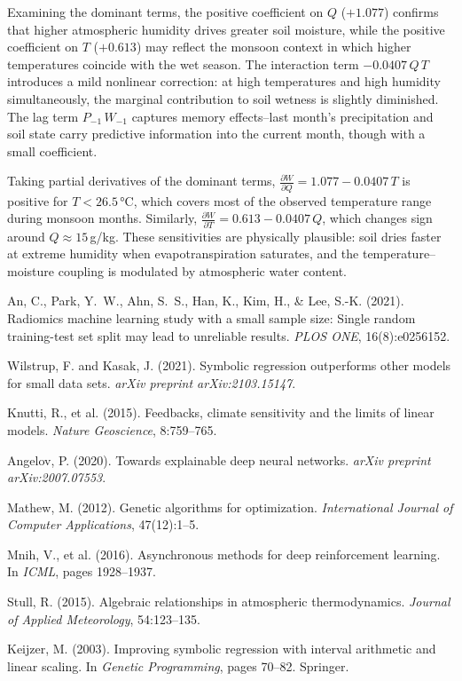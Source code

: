\documentclass{article}
\begin{document}
Examining the dominant terms, the positive coefficient on $Q$ ($+1.077$) confirms that higher atmospheric humidity drives greater soil moisture, while the positive coefficient on $T$ ($+0.613$) may reflect the monsoon context in which higher temperatures coincide with the wet season. The interaction term $-0.0407\, Q\, T$ introduces a mild nonlinear correction: at high temperatures and high humidity simultaneously, the marginal contribution to soil wetness is slightly diminished. The lag term $P_{-1}\, W_{-1}$ captures memory effects--last month's precipitation and soil state carry predictive information into the current month, though with a small coefficient.

Taking partial derivatives of the dominant terms, $\frac{\partial W}{\partial Q} = 1.077 - 0.0407\, T$ is positive for $T < 26.5$\,°C, which covers most of the observed temperature range during monsoon months. Similarly, $\frac{\partial W}{\partial T} = 0.613 - 0.0407\, Q$, which changes sign around $Q \approx 15$\,g/kg. These sensitivities are physically plausible: soil dries faster at extreme humidity when evapotranspiration saturates, and the temperature--moisture coupling is modulated by atmospheric water content.


\begin{thebibliography}{}

An, C., Park, Y.~W., Ahn, S.~S., Han, K., Kim, H., \& Lee, S.-K. (2021).
Radiomics machine learning study with a small sample size: Single random training-test set split may lead to unreliable results.
\textit{PLOS ONE}, 16(8):e0256152.

Wilstrup, F. and Kasak, J. (2021).
Symbolic regression outperforms other models for small data sets.
\textit{arXiv preprint arXiv:2103.15147}.

Knutti, R., et al. (2015).
Feedbacks, climate sensitivity and the limits of linear models.
\textit{Nature Geoscience}, 8:759--765.

Angelov, P. (2020).
Towards explainable deep neural networks.
\textit{arXiv preprint arXiv:2007.07553}.

Mathew, M. (2012).
Genetic algorithms for optimization.
\textit{International Journal of Computer Applications}, 47(12):1--5.

Mnih, V., et al. (2016).
Asynchronous methods for deep reinforcement learning.
In \textit{ICML}, pages 1928--1937.

Stull, R. (2015).
Algebraic relationships in atmospheric thermodynamics.
\textit{Journal of Applied Meteorology}, 54:123--135.

Keijzer, M. (2003).
Improving symbolic regression with interval arithmetic and linear scaling.
In \textit{Genetic Programming}, pages 70--82. Springer.

\end{thebibliography}
\end{document}
